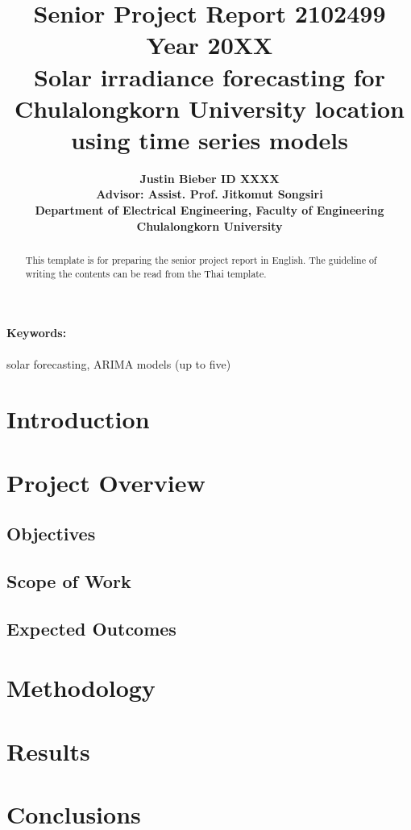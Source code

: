 \documentclass[11pt,a4paper]{article}
\title{\bf Senior Project Report 2102499 Year 20XX  \\[2ex]
Solar irradiance forecasting for Chulalongkorn University location using time series models
}
\author{ \bf Justin Bieber ID XXXX  \\[1ex]
\bf Advisor: Assist. Prof. Jitkomut Songsiri \\[1ex]
\bf Department of Electrical Engineering, Faculty of Engineering \\[1ex]
\bf Chulalongkorn University
}
\date{}
\begin{document}
\maketitle

\begin{abstract}
This template is for preparing the senior project report in English. The guideline of writing the contents can be read from the Thai template. 
\end{abstract}

\paragraph{\textbf Keywords:} solar forecasting, ARIMA models (up to five) \\


\newpage
\tableofcontents




\newpage
\section{Introduction}

\section{Project Overview}
\subsection{Objectives}
\subsection{Scope of Work}
\subsection{Expected Outcomes}

\section{Methodology}
\label{sec:principle}

\section{Results}

\section{Conclusions}
\end{document}
